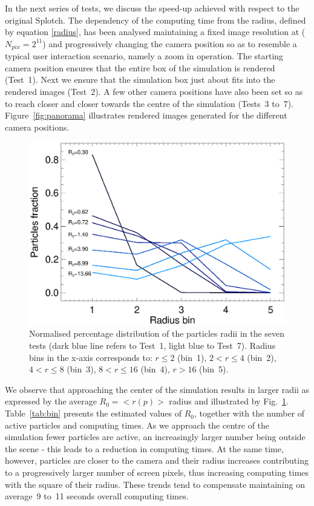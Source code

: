 \documentclass[preprint,5pt]{elsarticle}
\begin{document}
In the next series of tests, we discuss the speed-up achieved with respect to the original Splotch. 
The dependency of the computing time from the radius, defined by equation \eqref{radius}, has been analysed maintaining a fixed image resolution at ($N_{pix} = 2^{11}$) and progressively changing the camera position 
so as to resemble a typical user interaction scenario, namely a zoom in operation. 
The starting camera position ensures that the entire box of the simulation is rendered (Test~1). 
Next we ensure that the simulation box just about fits into the rendered images (Test~2). 
A few other camera positions have also been set so as to reach closer and closer towards the 
centre of the simulation (Tests~3 to~7). Figure~\ref{fig:panorama} illustrates rendered images generated for the different camera positions.

\begin{figure}
\includegraphics[scale=0.5]{radii.eps}
\caption{Normalised percentage distribution of the particles radii in the seven tests (dark blue line refers to Test~1, light blue to Test~7). Radius bins in the x-axis corresponds to: $r\le 2$ (bin~1), $2<r\le 4$ (bin~2), $4<r\le 8$ (bin~3), $8<r\le 16$ (bin~4), $r>16$ (bin~5). 
}
\label{fig:radii}
\end{figure}

We observe that approaching the center of the simulation results in larger radii 
as expressed by the average $R_0=<r(p)>$ radius and illustrated by Fig.~\ref{fig:radii}. 
Table~\ref{tab:bin} presents the estimated values of $R_0$, together with the number of active particles and computing times. As we approach the centre of the simulation fewer particles are active, an increasingly larger number being outside the scene - this leads to a reduction in computing times. At the same time, however, particles are closer to the camera and their radius increases contributing to a progressively larger number of screen pixels,
thus increasing computing times with the square of their radius. 
These trends tend to compensate maintaining on average~9 to~11 seconds overall computing times.
\end{document}
